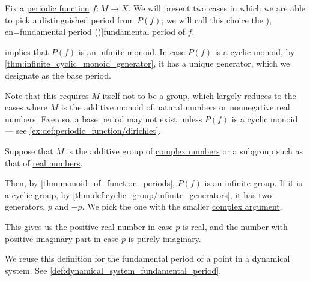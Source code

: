 \begin{definition}\label{def:fundamental_function_period}\mimprovised
  Fix a \hyperref[def:periodic_function]{periodic function} \( f: M \to X \). We will present two cases in which we are able to pick a distinguished period from \( P(f) \); we will call this choice the \term[ru=основной период (\cite[102]{Маркушевич1967АналитическиеФункцииТом1}), en=fundamental period (\cite[157]{Apostol1976AnalyticNumberTheory})]{fundamental period} of \( f \).

  \begin{thmenum}
      implies that \( P(f) \) is an infinite monoid. In case \( P(f) \) is a \hyperref[def:cyclic_monoid]{cyclic monoid}, by \cref{thm:infinite_cyclic_monoid_generator}, it has a unique generator, which we designate as the base period.

    Note that this requires \( M \) itself not to be a group, which largely reduces to the cases where \( M \) is the additive monoid of natural numbers or nonnegative real numbers. Even so, a base period may not exist unless \( P(f) \) is a cyclic monoid --- see \cref{ex:def:periodic_function/dirichlet}.

     Suppose that \( M \) is the additive group of \hyperref[def:complex_numbers]{complex numbers} or a subgroup such as that of \hyperref[def:real_numbers]{real numbers}.

    Then, by \cref{thm:monoid_of_function_periods}, \( P(f) \) is an infinite group. If it is a \hyperref[def:cyclic_group]{cyclic group}, by \cref{thm:def:cyclic_group/infinite_generators}, it has two generators, \( p \) and \( -p \). We pick the one with the smaller \hyperref[def:complex_numbers_trigonometric_form]{complex argument}.

    This gives us the positive real number in case \( p \) is real, and the number with positive imaginary part in case \( p \) is purely imaginary.
  \end{thmenum}
\end{definition}
\begin{comments}
  \item We reuse this definition for the fundamental period of a point in a dynamical system. See \cref{def:dynamical_system_fundamental_period}.
\end{comments}

